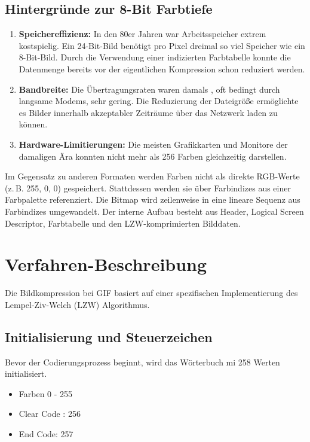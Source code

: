 \documentclass[11pt,a4paper]{article}
\begin{document}
	\subsection{Hintergründe zur 8-Bit Farbtiefe}
	\begin{enumerate}
		\item \textbf{Speichereffizienz:} In den 80er Jahren war Arbeitsspeicher extrem kostspielig. Ein 24-Bit-Bild  benötigt pro Pixel dreimal so viel Speicher wie ein 8-Bit-Bild. Durch die Verwendung einer indizierten Farbtabelle konnte die Datenmenge bereits vor der eigentlichen Kompression schon reduziert werden.
		\item \textbf{Bandbreite:} Die Übertragungsraten waren damals , oft bedingt durch langsame Modems, sehr gering. Die Reduzierung der Dateigröße ermöglichte es Bilder innerhalb akzeptabler Zeiträume über das Netzwerk laden zu können.
		\item \textbf{Hardware-Limitierungen:} Die meisten Grafikkarten und Monitore der damaligen Ära konnten nicht mehr als 256 Farben gleichzeitig darstellen.
	\end{enumerate}
	
	Im Gegensatz zu anderen Formaten werden Farben nicht als direkte RGB-Werte (z.\,B. 255, 0, 0) gespeichert. Stattdessen werden sie über Farbindizes aus einer Farbpalette referenziert. Die Bitmap wird zeilenweise in eine lineare Sequenz aus Farbindizes umgewandelt. Der interne Aufbau besteht aus Header, Logical Screen Descriptor, Farbtabelle und den LZW-komprimierten Bilddaten.
	
	\section{Verfahren-Beschreibung}
	Die Bildkompression bei GIF basiert auf einer spezifischen Implementierung des Lempel-Ziv-Welch (LZW) Algorithmus.
	
	\subsection{Initialisierung und Steuerzeichen}
	Bevor der Codierungsprozess beginnt, wird das Wörterbuch mi 258 Werten initialisiert.
	
	\begin{itemize}
		\item {Farben 0 - 255}
		\item {Clear Code : 256}
		\item{End Code: 257 }
	\end{itemize}
	
\end{document}

